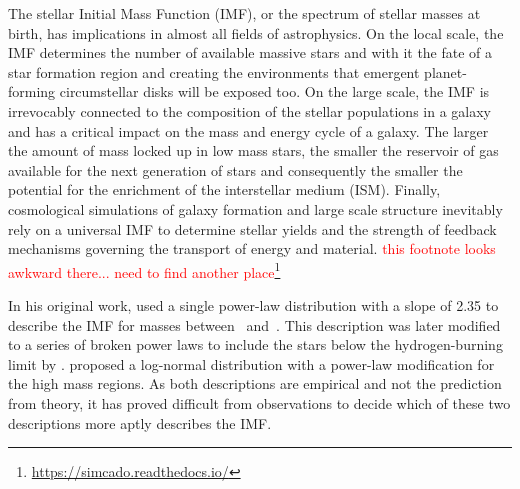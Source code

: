The stellar Initial Mass Function (IMF), or the spectrum of stellar masses at birth, has implications in almost all fields of astrophysics. On the local scale, the IMF determines the number of available massive stars and with it the fate of a star formation region and creating the environments that emergent planet-forming circumstellar disks will be exposed too. 
On the large scale, the IMF is irrevocably connected to the composition of the stellar populations in a galaxy and has a critical impact on the mass and energy cycle of a galaxy. The larger the amount of mass locked up in low mass stars, the smaller the reservoir of gas available for the next generation of stars and consequently the smaller the potential for the enrichment of the interstellar medium (ISM). Finally, cosmological simulations of galaxy formation and large scale structure inevitably rely on a universal IMF to determine stellar yields and the strength of feedback mechanisms governing the transport of energy and material. 
\textcolor{red}{this footnote looks awkward there... need to find another place}\footnote{\url{https://simcado.readthedocs.io/}}


In his original work, \citet{salpeter1955} used a single power-law distribution with a slope of 2.35 to describe the IMF for masses between \ and \,\msun . This description was later modified to a series of broken power laws to include the stars below the hydrogen-burning limit by \citet{kroupa2001}. \citet{chabrier2005} proposed a log-normal distribution with a power-law modification for the high mass regions. As both descriptions are empirical and not the prediction from theory, it has proved difficult from observations to decide which of these two descriptions more aptly describes the IMF.

